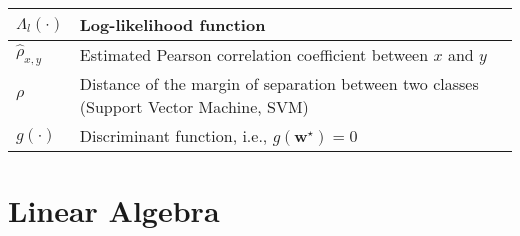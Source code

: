 \documentclass{article}
\begin{document}
\begin{xltabular}{\textwidth}{XX}
	\(\Lambda_l(\cdot)\)                                                                                                  & Log-likelihood function                                                                                                                                                                                                      \\ \hline
	\(\hat{\rho}_{x,y}\)                                                                                                  & Estimated Pearson correlation coefficient between \(x\) and \(y\)                                                                                                                                                            \\ \hline
	\(\rho\)                                                                                                              & Distance of the margin of separation between two classes (Support Vector Machine, SVM)                                                                                                                                       \\ \hline
	\(g(\cdot)\)                                                                                                          & Discriminant function, i.e., \(g(\mathbf{w}^{\star}) = 0\)
\end{xltabular}

\section{Linear Algebra}
\end{document}
